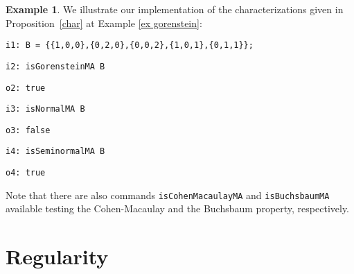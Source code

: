 \documentclass[11pt,a4paper]{amsart}%
\theoremstyle{definition}
\newtheorem{example}[theorem]{Example}
\theoremstyle{remark}
\numberwithin{equation}{section}
\theoremstyle{plain}
\begin{document}
\begin{example}
We illustrate our implementation of the characterizations given in Proposition~\ref{char} at Example \ref{ex gorenstein}:

\texttt{i1: B = \{\{1,0,0\},\{0,2,0\},\{0,0,2\},\{1,0,1\},\{0,1,1\}\};}

\texttt{i2: isGorensteinMA B}

\texttt{o2: true}

\texttt{i3: isNormalMA B}

\texttt{o3: false}

\texttt{i4: isSeminormalMA B}

\texttt{o4: true}

\noindent Note that there are also commands \texttt{isCohenMacaulayMA} and \texttt{isBuchsbaumMA} available testing the Cohen-Macaulay and the Buchsbaum property, respectively.

\end{example}




\section{Regularity\label{sec simplicial homogeneous case}}
\end{document}
